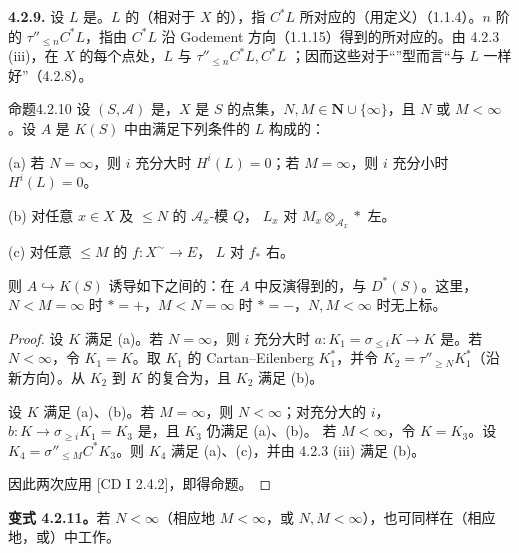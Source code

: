 \textbf{4.2.9.} 设 $L$ 是。$L$ 的（相对于 $X$ 的），指 $C^*L$ 所对应的（用定义）（1.1.4）。$n$ 阶的 $\tau''_{\le n}C^*L$，指由 $C^*L$ 沿 Godement 方向（1.1.15）得到的所对应的。由 4.2.3 (iii)，在 $X$ 的每个点处，$L$ 与 $\tau''_{\le n}C^*L,C^*L$ ；因而这些对于“”型而言“与 $L$ 一样好”（4.2.8）。
\begin{SGAresult}{命题}{4.2.10}
设 $(S,\mathscr A)$ 是，$X$ 是 $S$ 的点集，$N,M\in\mathbf N\cup\{\infty\}$，且 $N$ 或 $M<\infty$。设 $A$ 是 $K(S)$ 中由满足下列条件的 $L$ 构成的：

(a) 若 $N=\infty$，则 $i$ 充分大时 $H^i(L)=0$；若 $M=\infty$，则 $i$ 充分小时 $H^i(L)=0$。

(b) 对任意 $x\in X$ 及 $\le N$ 的 $\mathscr A_x$-模 $Q$， $L_x$ 对 $M_x\otimes_{\mathscr A_x}*$ 左。

(c) 对任意 $\le M$ 的 $f:X^\sim\to E$， $L$ 对 $f_*$ 右。

则 $A\hookrightarrow K(S)$ 诱导如下之间的：在 $A$ 中反演得到的，与 $D^*(S)$。这里，$N<M=\infty$ 时 $*=+$，$M<N=\infty$ 时 $*=-$，$N,M<\infty$ 时无上标。
\end{SGAresult}
\begin{proof}
设 $K$ 满足 (a)。若 $N=\infty$，则 $i$ 充分大时 $a:K_1=\sigma_{\le i}K\to K$ 是。若 $N<\infty$，令 $K_1=K$。取 $K_1$ 的 Cartan--Eilenberg  $K_1^*$，并令 $K_2=\tau''_{\ge N}K_1^*$（沿新方向）。从 $K_2$ 到 $K$ 的复合为，且 $K_2$ 满足 (b)。

设 $K$ 满足 (a)、(b)。若 $M=\infty$，则 $N<\infty$；对充分大的 $i$，$b:K\to\sigma_{\ge i}K_1=K_3$ 是，且 $K_3$ 仍满足 (a)、(b)。
若 $M<\infty$，令 $K=K_3$。设 $K_4=\sigma''_{\le M}C^*K_3$。则 $K_4$ 满足 (a)、(c)，并由 4.2.3 (iii) 满足 (b)。

因此两次应用 [CD I 2.4.2]，即得命题。
\end{proof}
\textbf{变式 4.2.11。}若 $N<\infty$（相应地 $M<\infty$，或 $N,M<\infty$），也可同样在（相应地，或）中工作。

